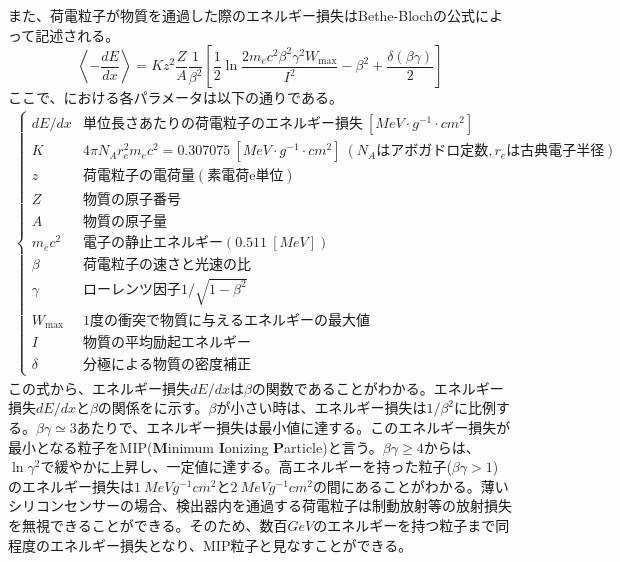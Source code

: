 また、荷電粒子が物質を通過した際のエネルギー損失はBethe-Blochの公式によって記述される。
\begin{equation}
  \label{eq:bethe}
  \left\langle -\frac{dE}{dx} \right\rangle = Kz^2\frac{Z}{A}\frac{1}{\beta^2}\left[ \frac{1}{2}\ln\frac{2m_e c^2 \beta^2 \gamma^2 W_\mathrm{max}}{I^2} -\beta^2 + \frac{\delta (\beta\gamma)}{2} \right]
\end{equation}
ここで、における各パラメータは以下の通りである。
\begin{align*}
  \begin{cases}
    dE/dx & \mathrm{単位長さあたりの荷電粒子のエネルギー損失}\ [\si{MeV\cdot g^{-1}\cdot cm^2}]\\
    K & 4\pi N_A r^2_e m_e c^2 = 0.307075\ [\si{MeV\cdot g^{-1}\cdot cm^2}]\ (N_A\mathrm{はアボガドロ定数}, r_e\mathrm{は古典電子半径})\\
    z & \mathrm{荷電粒子の電荷量(素電荷e単位)}\\
    Z & \mathrm{物質の原子番号}\\
    A & \mathrm{物質の原子量}\\
    m_e c^2 & \mathrm{電子の静止エネルギー}(0.511\ [\si{MeV}]) \\
    \beta & \mathrm{荷電粒子の速さと光速の比}\\
    \gamma & \mathrm{ローレンツ因子} 1/\sqrt{1-\beta^2} \\
    W_\mathrm{max} & \mathrm{1度の衝突で物質に与えるエネルギーの最大値} \\
    I & \mathrm{物質の平均励起エネルギー}\\
    \delta & \mathrm{分極による物質の密度補正}
  \end{cases}
\end{align*}
この式から、エネルギー損失$dE/dx$は$\beta$の関数であることがわかる。エネルギー損失$dE/dx$と$\beta$の関係をに示す。$\beta$が小さい時は、エネルギー損失は$1/\beta^2$に比例する。$\beta\gamma \simeq 3$あたりで、エネルギー損失は最小値に達する。このエネルギー損失が最小となる粒子をMIP(\textbf{M}inimum \textbf{I}onizing \textbf{P}article)と言う。$\beta\gamma\geq4$からは、$\ln\gamma^2$で緩やかに上昇し、一定値に達する。高エネルギーを持った粒子($\beta\gamma>1$)のエネルギー損失は$1\ \si{MeVg^{-1}cm^2}$と$2\ \si{MeVg^{-1}cm^2}$の間にあることがわかる。薄いシリコンセンサーの場合、検出器内を通過する荷電粒子は制動放射等の放射損失を無視できることができる。そのため、数百$\si{GeV}$のエネルギーを持つ粒子まで同程度のエネルギー損失となり、MIP粒子と見なすことができる。

